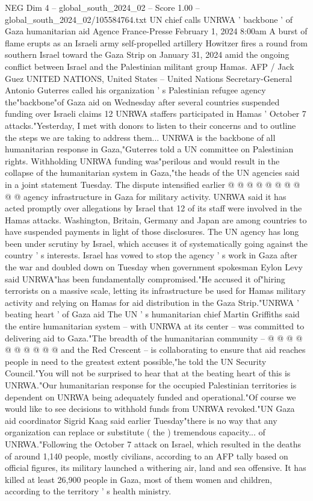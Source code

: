\begin{textsample}{NEG Dim 4 – global\_south\_2024\_02 – Score 1.00 – global\_south\_2024\_02/105584764.txt}  \label{ex:f4_neg_382}
UN chief calls UNRWA ' backbone ' of Gaza humanitarian aid Agence France-Presse February 1, 2024 8:00am A burst of flame erupts as an Israeli army self-propelled artillery Howitzer fires a round from southern Israel toward the Gaza Strip on January 31, 2024 amid the ongoing conflict between Israel and the Palestinian militant group Hamas.
AFP / Jack Guez UNITED NATIONS, United States -- United Nations Secretary-General Antonio Guterres called his organization ' s Palestinian refugee agency the"backbone"of Gaza aid on Wednesday after several countries suspended funding over Israeli claims 12 UNRWA staffers participated in Hamas ' October 7 attacks."Yesterday, I met with donors to listen to their concerns and to outline the steps we are taking to address them...
UNRWA is the backbone of all humanitarian response in Gaza,"Guterres told a UN committee on Palestinian rights.
Withholding UNRWA funding was"perilous and would result in the collapse of the humanitarian system in Gaza,"the heads of the UN agencies said in a joint statement Tuesday.
The dispute intensified earlier @ @ @ @ @ @ @ @ @ @ agency infrastructure in Gaza for military activity.
UNRWA said it has acted promptly over allegations by Israel that 12 of its staff were involved in the Hamas attacks.
Washington, Britain, Germany and Japan are among countries to have suspended payments in light of those disclosures.
The UN agency has long been under scrutiny by Israel, which accuses it of systematically going against the country ' s interests.
Israel has vowed to stop the agency ' s work in Gaza after the war and doubled down on Tuesday when government spokesman Eylon Levy said UNRWA"has been fundamentally compromised."He accused it of"hiring terrorists on a massive scale, letting its infrastructure be used for Hamas military activity and relying on Hamas for aid distribution in the Gaza Strip."UNRWA ' beating heart ' of Gaza aid The UN ' s humanitarian chief Martin Griffiths said the entire humanitarian system -- with UNRWA at its center -- was committed to delivering aid to Gaza."The breadth of the humanitarian community -- @ @ @ @ @ @ @ @ @ @ and the Red Crescent -- is collaborating to ensure that aid reaches people in need to the greatest extent possible,"he told the UN Security Council."You will not be surprised to hear that at the beating heart of this is UNRWA."Our humanitarian response for the occupied Palestinian territories is dependent on UNRWA being adequately funded and operational."Of course we would like to see decisions to withhold funds from UNRWA revoked."UN Gaza aid coordinator Sigrid Kaag said earlier Tuesday"there is no way that any organization can replace or substitute ( the ) tremendous capacity... of UNRWA."Following the October 7 attack on Israel, which resulted in the deaths of around 1,140 people, mostly civilians, according to an AFP tally based on official figures, its military launched a withering air, land and sea offensive.
It has killed at least 26,900 people in Gaza, most of them women and children, according to the territory ' s health ministry.

\end{textsample}
